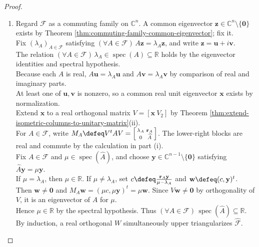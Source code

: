 \begin{theorem}
\begin{proof}
\begin{enumerate}[label=(\roman*)]
The matrix $U$ is unitary by Proposition \ref{prop:algebra-of-unitary-matrices}(i)--(ii), and $(\forall A\in\mathcal{F})\,U^*AU$ is upper triangular.
\item Regard $\mathcal{F}$ as a commuting family on $\mathbb{C}^n$. A common eigenvector $\mathbf{z}\in\mathbb{C}^n\setminus\{\mathbf{0}\}$ exists by Theorem \ref{thm:commuting-family-common-eigenvector}; fix it.\\
Fix $(\lambda_A)_{A\in\mathcal{F}}$ satisfying $(\forall A\in\mathcal{F})\,A\mathbf{z}=\lambda_A\mathbf{z}$, and write $\mathbf{z}=\mathbf{u}+i\mathbf{v}$.\\
The relation $(\forall A\in\mathcal{F})\,\lambda_A\in\operatorname{spec}(A)\subseteq\mathbb{R}$ holds by the eigenvector identities and spectral hypothesis.\\
Because each $A$ is real, $A\mathbf{u}=\lambda_A\mathbf{u}$ and $A\mathbf{v}=\lambda_A\mathbf{v}$ by comparison of real and imaginary parts.\\
At least one of $\mathbf{u},\mathbf{v}$ is nonzero, so a common real unit eigenvector $\mathbf{x}$ exists by normalization.\\
Extend $\mathbf{x}$ to a real orthogonal matrix $V=[\mathbf{x}\ V_2]$ by Theorem \ref{thm:extend-isometric-columns-to-unitary-matrix}(ii).\\
For $A\in\mathcal{F}$, write $M_A\defeq V^tAV=\left[\begin{smallmatrix}\lambda_A&\mathbf{r}_A\\0&\widehat A\end{smallmatrix}\right]$. The lower-right blocks are real and commute by the calculation in part (i).\\
Fix $A\in\mathcal{F}$ and $\mu\in\operatorname{spec}(\widehat A)$, and choose $\mathbf{y}\in\mathbb{C}^{n-1}\setminus\{\mathbf{0}\}$ satisfying $\widehat A\mathbf{y}=\mu\mathbf{y}$.\\
If $\mu=\lambda_A$, then $\mu\in\mathbb{R}$. If $\mu\neq\lambda_A$, set $c\defeq\frac{\mathbf{r}_A\mathbf{y}}{\mu-\lambda_A}$ and $\mathbf{w}\defeq(c,\mathbf{y})^t$.\\
Then $\mathbf{w}\neq\mathbf{0}$ and $M_A\mathbf{w}=(\mu c,\mu\mathbf{y})^t=\mu\mathbf{w}$. Since $V\mathbf{w}\neq\mathbf{0}$ by orthogonality of $V$, it is an eigenvector of $A$ for $\mu$.\\
Hence $\mu\in\mathbb{R}$ by the spectral hypothesis. Thus $(\forall A\in\mathcal{F})\,\operatorname{spec}(\widehat A)\subseteq\mathbb{R}$.\\
By induction, a real orthogonal $W$ simultaneously upper triangularizes $\widehat{\mathcal{F}}$.\\

\end{enumerate}
\end{proof}
\end{theorem}
